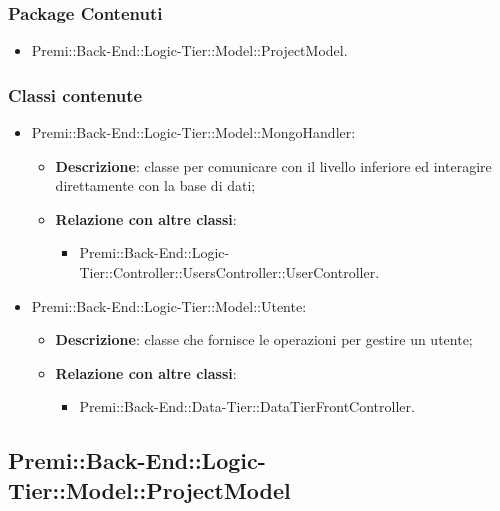 	\subsubsection*{Package Contenuti}
		\begin{itemize}
			\item Premi::Back-End::Logic-Tier::Model::ProjectModel.
		\end{itemize}
	
	\subsubsection*{Classi contenute}
	\begin{itemize}
		\item Premi::Back-End::Logic-Tier::Model::MongoHandler:
		\begin{itemize}
			\item \textbf{Descrizione}: classe per comunicare con il livello inferiore ed interagire direttamente con la base di dati;
			\item \textbf{Relazione con altre classi}:
			\begin{itemize}
				\item Premi::Back-End::Logic-Tier::Controller::UsersController::UserController.
			\end{itemize}
		\end{itemize}
			
		\item Premi::Back-End::Logic-Tier::Model::Utente:
		\begin{itemize}
			\item \textbf{Descrizione}: classe che fornisce le operazioni per gestire un utente;
			\item \textbf{Relazione con altre classi}:
			\begin{itemize}
				\item Premi::Back-End::Data-Tier::DataTierFrontController.
			\end{itemize}
		\end{itemize}
	\end{itemize}

\newpage

\subsection{Premi::Back-End::Logic-Tier::Model::ProjectModel}
